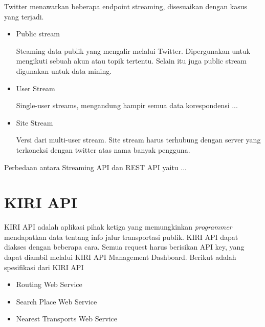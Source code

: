 Twitter menawarkan beberapa endpoint streaming, disesuaikan dengan kasus yang terjadi. 
\begin{itemize}
	\item Public stream
	
	Steaming data publik yang mengalir melalui Twitter. Dipergunakan untuk mengikuti sebuah akun atau topik tertentu. Selain itu juga public stream digunakan untuk data mining.
	\item User Stream
	
	Single-user streams, mengandung hampir semua data korespondensi ...
	
	\item Site Stream
	
	Versi dari multi-user stream. Site stream harus terhubung dengan server yang terkoneksi dengan twitter atas nama banyak pengguna.
\end{itemize}

Perbedaan antara Streaming API dan REST API yaitu ...





\section{KIRI API}
KIRI API adalah aplikasi pihak ketiga yang memungkinkan \textit{programmer} mendapatkan data tentang info jalur transportasi publik. KIRI API dapat diakses dengan beberapa cara. Semua request harus berisikan API key, yang dapat diambil melalui KIRI API Management Dashboard. Berikut adalah spesifikasi dari KIRI API

\begin{itemize}
	\item Routing Web Service
	\item Search Place Web Service
	\item Nearest Transports Web Service
\end{itemize}